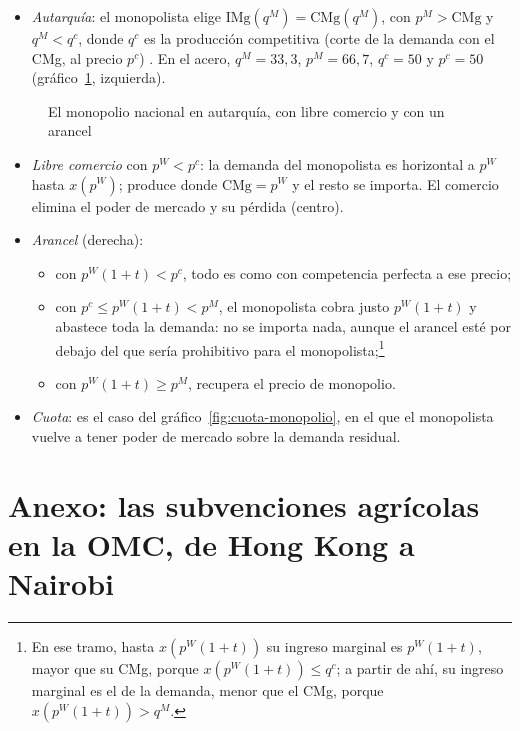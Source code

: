 \documentclass[11pt]{article}
\begin{document}
\begin{itemize}
\item \emph{Autarquía}: el monopolista elige $\mathrm{IMg}(q^M)=\mathrm{CMg}(q^M)$, con $p^M>\mathrm{CMg}$ y $q^M<q^c$, donde $q^c$ es la producción competitiva (corte de la demanda con el CMg, al precio $p^c$) . En el acero, $q^M=33{,}3$, $p^M=66{,}7$, $q^c=50$ y $p^c=50$ (gráfico~\ref{fig:monopolio-comercio}, izquierda).
\end{itemize}
\begin{figure}[H]
\centering
\caption{El monopolio nacional en autarquía, con libre comercio y con un arancel}\label{fig:monopolio-comercio}
\end{figure}
\begin{itemize}
\item \emph{Libre comercio} con $p^W<p^c$: la demanda del monopolista es horizontal a $p^W$ hasta $x(p^W)$; produce donde $\mathrm{CMg}=p^W$ y el resto se importa. El comercio elimina el poder de mercado y su pérdida (centro).
\item \emph{Arancel} (derecha):
  \begin{itemize}
  \item con $p^W(1+t)<p^c$, todo es como con competencia perfecta a ese precio;
  \item con $p^c\leq p^W(1+t)<p^M$, el monopolista cobra justo $p^W(1+t)$ y abastece toda la demanda: no se importa nada, aunque el arancel esté por debajo del que sería prohibitivo para el monopolista;\footnote{En ese tramo, hasta $x(p^W(1+t))$ su ingreso marginal es $p^W(1+t)$, mayor que su CMg, porque $x(p^W(1+t))\leq q^c$; a partir de ahí, su ingreso marginal es el de la demanda, menor que el CMg, porque $x(p^W(1+t))>q^M$.}
  \item con $p^W(1+t)\geq p^M$, recupera el precio de monopolio.
  \end{itemize}
\item \emph{Cuota}: es el caso del gráfico~\ref{fig:cuota-monopolio}, en el que el monopolista vuelve a tener poder de mercado sobre la demanda residual.
\end{itemize}

\section{Anexo: las subvenciones agrícolas en la OMC,\cortetitulo{} de Hong Kong a Nairobi}\label{anexo:agricultura}
\end{document}
